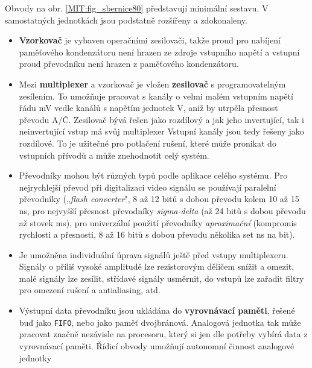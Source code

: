         Obvody na obr. \ref{MIT:fig_sbernice80} představují minimální sestavu. V samostatných 
        jednotkách jsou podstatně rozšířeny a zdokonaleny.
      \begin{itemize}\addtolength{\itemsep}{-0.5\baselineskip}
        \item \textbf{Vzorkovač} je vybaven operačními zesilovači, takže proud pro nabíjení  
              paměťového kondenzátoru není hrazen ze zdroje vstupního napětí a vstupní proud 
              převodníku není hrazen z paměťového kondenzátoru.
        \item Mezi \textbf{multiplexer} a vzorkovač je vložen \textbf{zesilovač} s programovatelným 
              zesílením. To umožňuje pracovat s kanály o velmi malém vstupním napětí řádu mV vedle 
              kanálů s napětím jednotek V, aniž by utrpěla přesnost převodu A/Č. Zesilovač bývá 
              řešen jako rozdílový a jak jeho invertující, tak i neinvertující vstup má svůj 
              multiplexer Vstupní kanály jsou tedy řešeny jako rozdílové. To je užitečné pro 
              potlačení rušení, které může pronikat do vstupních přívodů a může znehodnotit celý 
              systém.
        \item Převodníky mohou být různých typů podle aplikace celého systému. Pro nejrychlejší 
              převod při  digitalizaci video signálu se používají paralelní převodníky 
              („\emph{flash converter}", 8 až 12 bitů s dobou převodu kolem 10 až 15 ns, pro 
              nejvyšší přesnost převodníky \emph{sigma-delta} (až 24 bitů s dobou převodu až stovek 
              ms), pro univerzální použití převodníky \emph{aproximační} (kompromis rychlosti a 
              přesnosti, 8 až 16 bitů s dobou převodu několika set ns na bit).
        \item Je umožněna individuální úprava signálů ještě před vstupy multiplexeru. Signály o  
              příliš vysoké amplitudě lze rezistorovým děličem snížit a omezit, malé signály lze 
              zesílit, střídavé signály usměrnit, do vstupů lze zařadit filtry pro omezení rušení a 
              antialiasing, atd.
        \item Výstupní data převodníku jsou ukládána do \textbf{vyrovnávací paměti}, řešené buď 
              jako \texttt{FIFO}, nebo jako paměť dvojbránová. Analogová jednotka tak může pracovat 
              značně nezávisle na procesoru, který si jen dle potřeby vybírá data z vyrovnávací 
              paměti. Řídicí obvody umožňují autonomní činnost analogové jednotky       
      \end{itemize}
      
